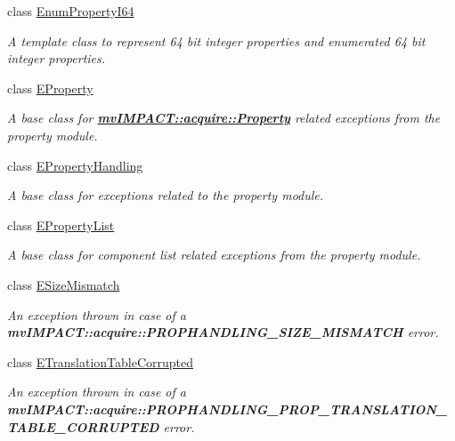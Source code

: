 \begin{DoxyCompactItemize}
class \hyperlink{classmv_i_m_p_a_c_t_1_1acquire_1_1_enum_property_i64}{Enum\+Property\+I64}
\begin{DoxyCompactList}\small\item\em A template class to represent 64 bit integer properties and enumerated 64 bit integer properties. \end{DoxyCompactList}\item 
class \hyperlink{classmv_i_m_p_a_c_t_1_1acquire_1_1_e_property}{E\+Property}
\begin{DoxyCompactList}\small\item\em A base class for {\bfseries \hyperlink{classmv_i_m_p_a_c_t_1_1acquire_1_1_property}{mv\+I\+M\+P\+A\+C\+T\+::acquire\+::\+Property}} related exceptions from the property module. \end{DoxyCompactList}\item 
class \hyperlink{classmv_i_m_p_a_c_t_1_1acquire_1_1_e_property_handling}{E\+Property\+Handling}
\begin{DoxyCompactList}\small\item\em A base class for exceptions related to the property module. \end{DoxyCompactList}\item 
class \hyperlink{classmv_i_m_p_a_c_t_1_1acquire_1_1_e_property_list}{E\+Property\+List}
\begin{DoxyCompactList}\small\item\em A base class for component list related exceptions from the property module. \end{DoxyCompactList}\item 
class \hyperlink{classmv_i_m_p_a_c_t_1_1acquire_1_1_e_size_mismatch}{E\+Size\+Mismatch}
\begin{DoxyCompactList}\small\item\em An exception thrown in case of a {\bfseries mv\+I\+M\+P\+A\+C\+T\+::acquire\+::\+P\+R\+O\+P\+H\+A\+N\+D\+L\+I\+N\+G\+\_\+\+S\+I\+Z\+E\+\_\+\+M\+I\+S\+M\+A\+T\+C\+H} error. \end{DoxyCompactList}\item 
class \hyperlink{classmv_i_m_p_a_c_t_1_1acquire_1_1_e_translation_table_corrupted}{E\+Translation\+Table\+Corrupted}
\begin{DoxyCompactList}\small\item\em An exception thrown in case of a {\bfseries mv\+I\+M\+P\+A\+C\+T\+::acquire\+::\+P\+R\+O\+P\+H\+A\+N\+D\+L\+I\+N\+G\+\_\+\+P\+R\+O\+P\+\_\+\+T\+R\+A\+N\+S\+L\+A\+T\+I\+O\+N\+\_\+\+T\+A\+B\+L\+E\+\_\+\+C\+O\+R\+R\+U\+P\+T\+E\+D} error. \end{DoxyCompactList}\item 

\end{DoxyCompactItemize}
